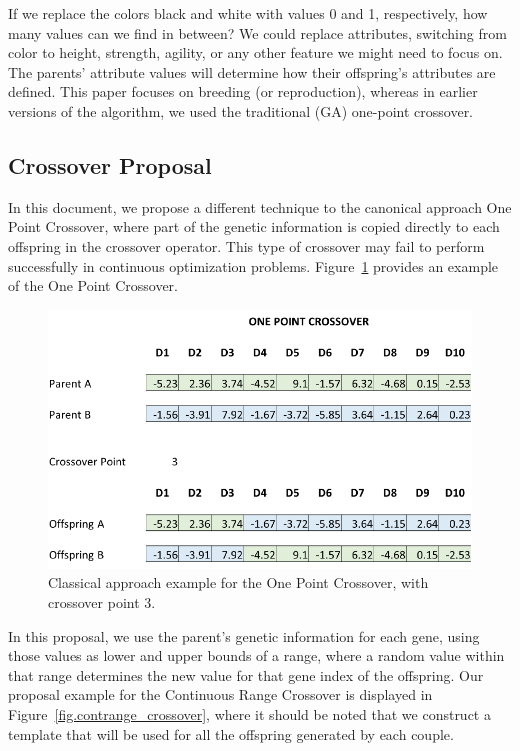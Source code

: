 \documentclass[graybox]{svmult}
\begin{document}
    If we replace the colors black and white with values 0 and 1, respectively, how many values can we find in between? We could replace attributes, switching from color to height, strength, agility, or any other feature we might need to focus on. The parents' attribute values will determine how their offspring's attributes are defined. This paper focuses on breeding (or reproduction), whereas in earlier versions of the algorithm, we used the traditional (GA) one-point crossover. 

    \subsection{Crossover Proposal}

    In this document, we propose a different technique to the canonical approach One Point Crossover, where part of the genetic information is copied directly to each offspring in the crossover operator. This type of crossover may fail to perform successfully in continuous optimization problems. Figure~\ref{fig.onepoint_crossover} provides an example of the One Point Crossover.

    \begin{figure}[!ht]
        \centering
        \includegraphics[width=0.90\linewidth]{img/fig_onepoint_crossover.pdf}
        \caption{Classical approach example for the One Point Crossover, with crossover point 3.} \label{fig.onepoint_crossover}
        \end{figure}

    In this proposal, we use the parent's genetic information for each gene, using those values as lower and upper bounds of a range, where a random value within that range determines the new value for that gene index of the offspring. Our proposal example for the Continuous Range Crossover is displayed in Figure~\ref{fig.contrange_crossover}, where it should be noted that we construct a template that will be used for all the offspring generated by each couple.
\end{document}
